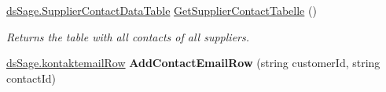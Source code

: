 \begin{DoxyCompactItemize}
\item 
\hyperlink{class_products_1_1_data_1_1ds_sage_1_1_supplier_contact_data_table}{ds\+Sage.\+Supplier\+Contact\+Data\+Table} \hyperlink{class_products_1_1_data_1_1_data_service_ae7331cff880ea441f6a85f90d8516a5d}{Get\+Supplier\+Contact\+Tabelle} ()
\begin{DoxyCompactList}\small\item\em Returns the table with all contacts of all suppliers. \end{DoxyCompactList}\item 
\hyperlink{class_products_1_1_data_1_1ds_sage_1_1kontaktemail_row}{ds\+Sage.\+kontaktemail\+Row} {\bfseries Add\+Contact\+Email\+Row} (string customer\+Id, string contact\+Id)\hypertarget{class_products_1_1_data_1_1_data_service_ae6c3f57e68c41852ea52d6b262503d51}{}\label{class_products_1_1_data_1_1_data_service_ae6c3f57e68c41852ea52d6b262503d51}


\end{DoxyCompactItemize}
